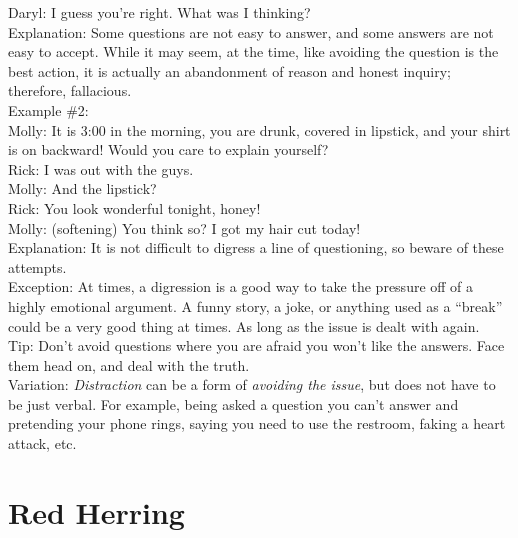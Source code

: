 \documentclass[a4paper,12pt,single,pdftex]{scrbook}
\begin{document}
{      
        Daryl:  I guess you’re right.  What was I thinking?
      \\

      
        Explanation: Some questions are not easy to answer, and some answers are not easy to accept.  While it may seem, at the time, like avoiding the question is the best action, it is actually an abandonment of reason and honest inquiry; therefore, fallacious.
      \\

      
        Example \#2:
      \\

      
        Molly: It is 3:00 in the morning, you are drunk, covered in lipstick, and your shirt is on backward!  Would you care to explain yourself?
      \\

      
        Rick: I was out with the guys.
      \\

      
        Molly: And the lipstick?
      \\

      
        Rick: You look wonderful tonight, honey!
      \\

      
        Molly: (softening) You think so?  I got my hair cut today!
      \\

      
        Explanation: It is not difficult to digress a line of questioning, so beware of these attempts.
      \\

      
        Exception: At times, a digression is a good way to take the pressure off of a highly emotional argument.  A funny story, a joke,  or anything used as a “break” could be a very good thing at times.  As long as the issue is dealt with again.
      \\

      
        Tip: Don’t avoid questions where you are afraid you won’t like the answers.  Face them head on, and deal with the truth.
      \\

      
        Variation: {\it Distraction} can be a form of {\it avoiding the issue}, but does not have to be just verbal.  For example, being asked a question you can’t answer and pretending your phone rings, saying you need to use the restroom, faking a heart attack, etc.
      \\

    
    \chapter{
      Red Herring
    }
  
}
\end{document}

